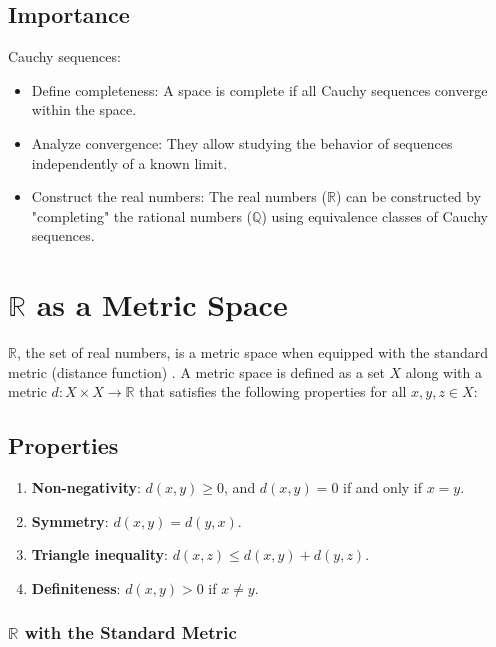\subsection{Importance}
Cauchy sequences:
\begin{itemize}
    \item Define completeness: A space is complete if all Cauchy sequences converge within the space.
    \item Analyze convergence: They allow studying the behavior of sequences independently of a known limit.
    \item Construct the real numbers: The real numbers (\( \mathbb{R} \)) can be constructed by "completing" the rational numbers (\( \mathbb{Q} \)) using equivalence classes of Cauchy sequences.
\end{itemize}

\section{\( \mathbb{R} \) as a Metric Space} \label{sub:metric_space}
\( \mathbb{R} \), the set of real numbers, is a metric space when equipped with the standard metric (distance function) \cite{rudin1976}. A metric space is defined as a set \( X \) along with a metric \( d: X \times X \to \mathbb{R} \) that satisfies the following properties for all \( x, y, z \in X \):

\subsection{Properties}
\begin{enumerate}[noitemsep, left=1cm, topsep=0pt]
    \item \textbf{Non-negativity}: \( d(x, y) \geq 0 \), and \( d(x, y) = 0 \) if and only if \( x = y \).
    \item \textbf{Symmetry}: \( d(x, y) = d(y, x) \).
    \item \textbf{Triangle inequality}: \( d(x, z) \leq d(x, y) + d(y, z) \).
    \item \textbf{Definiteness}: \( d(x, y) > 0 \) if \( x \neq y \).
\end{enumerate}

\subsubsection{ \( \mathbb{R} \) with the Standard Metric}

